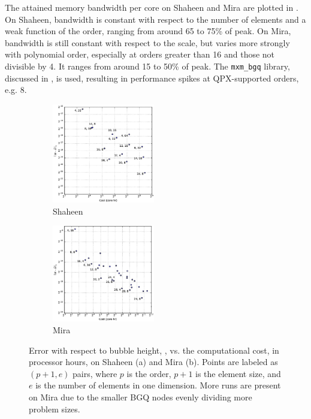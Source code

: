 The attained memory bandwidth per core on Shaheen and Mira are plotted in .
On Shaheen, bandwidth is constant with respect to the number of elements and a weak function of the order, ranging from around 65 to 75\% of peak.
On Mira, bandwidth is still constant with respect to the scale, but varies more strongly with polynomial order, especially at orders greater than 16 and those not divisible by 4.
It ranges from around 15 to 50\% of peak.
The \texttt{mxm\_bgq} library, discussed in , is used, resulting in performance spikes at QPX-supported orders, e.g. 8.

\begin{figure}
\begin{subfigure}[t]{0.49\textwidth}
\includegraphics[width=0.49\textwidth]{gfx/shaheen_H}
\caption{Shaheen}
\end{subfigure}
\begin{subfigure}[t]{0.49\textwidth}
\includegraphics[width=0.49\textwidth]{gfx/mira_H}
\caption{Mira}
\end{subfigure}



\caption{ 
Error with respect to bubble height, , vs. the computational cost, in processor hours, on Shaheen (a) and Mira (b).
Points are labeled as $(p+1, e)$ pairs, where $p$ is the order, $p+1$ is the element size, and $e$ is the number of elements in one dimension.
More runs are present on Mira due to the smaller BGQ nodes evenly dividing more problem sizes.
}
\end{figure}


